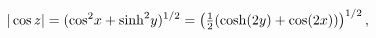 \[|\mathop{\cos\/}\nolimits z|=({\mathop{\cos\/}\nolimits^{2}}x+{\mathop{\sinh\/%
}\nolimits^{2}}y)^{1/2}=\left(\tfrac{1}{2}(\mathop{\cosh\/}\nolimits\!\left(2y%
\right)+\mathop{\cos\/}\nolimits\!\left(2x\right))\right)^{1/2},\]